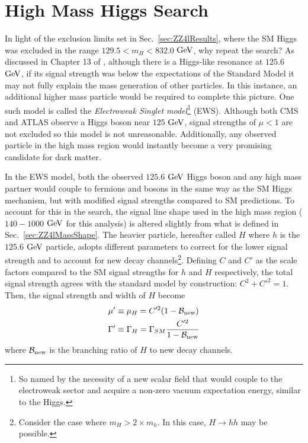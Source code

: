 \section{High Mass Higgs Search}
\label{sec:HighMass}

In light of the exclusion limits set in Sec.~\ref{sec:ZZ4lResults}, where the SM Higgs was excluded in the range $129.5<m_H<832.0$ $\rm{GeV}$, why repeat the search? As discussed in Chapter 13 of \cite{}, although there is a Higgs-like resonance at $125.6$ $\rm{GeV}$, if its signal strength was below the expectations of the Standard Model it may not fully explain the mass generation of other particles. In this instance, an additional higher mass particle would be required to complete this picture. One such model is called the \textit{Electroweak Singlet model}\footnote{So named by the necessity of a new scalar field that would couple to the electroweak sector and acquire a non-zero vacuum expectation energy, similar to the Higgs.} (EWS). Although both CMS and ATLAS observe a Higgs boson near $125$ $\rm{GeV}$, signal strengths of $\mu<1$ are not excluded so this model is not unreasonable. Additionally, any observed particle in the high mass region would instantly become a very promising candidate for dark matter.

In the EWS model, both the observed $125.6$ $\rm{GeV}$ Higgs boson and any high mass partner would couple to fermions and bosons in the same way as the SM Higgs mechanism, but with modified signal strengths compared to SM predictions. To account for this in the search, the signal line shape used in the high mass region ($140-1000$ $\rm{GeV}$ for this analysis) is altered slightly from what is defined in Sec.~\ref{sec:ZZ4lMassShape}. The heavier particle, hereafter called $H$ where $h$ is the $125.6$ $\rm{GeV}$ particle, adopts different parameters to correct for the lower signal strength and to account for new decay channels\footnote{Consider the case where $m_{H} > 2\times m_{h}$. In this case, $H\rightarrow hh$ may be possible.}. Defining $C$ and $C'$ as the scale factors compared to the SM signal strengths for $h$ and $H$ respectively, the total signal strength agrees with the standard model by construction: $C^2 + C'^2 = 1$. Then, the signal strength and width of $H$ become
\begin{align}
\mu' &\equiv \mu_{H} = C'^2 (1-\mathcal{B}_{\rm{new}}) \\
\Gamma' &\equiv \Gamma_{H} = \Gamma_{SM}\frac{C'^2}{1-\mathcal{B}_{\rm{new}}}
\end{align} 
where $\mathcal{B}_{\rm{new}}$ is the branching ratio of $H$ to new decay channels.

